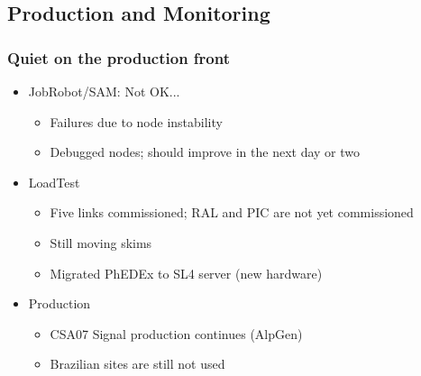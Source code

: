 \documentclass{beamer}
\begin{document}
\subsection{Production and Monitoring}
\begin{frame}
\frametitle{Quiet on the production front}
\begin{itemize}
    \item JobRobot/SAM: Not OK...
    \begin{itemize}
        \item Failures due to node instability
        \item Debugged nodes; should improve in the next day or two
    \end{itemize}
    \item LoadTest
    \begin{itemize}
        \item Five links commissioned; RAL and PIC are not yet commissioned
        \item Still moving skims
        \item Migrated PhEDEx to SL4 server (new hardware)
    \end{itemize}
    \item Production
    \begin{itemize}
        \item CSA07 Signal production continues (AlpGen)
        \item Brazilian sites are still not used
    \end{itemize}
\end{itemize}
\end{frame}
\end{document}
